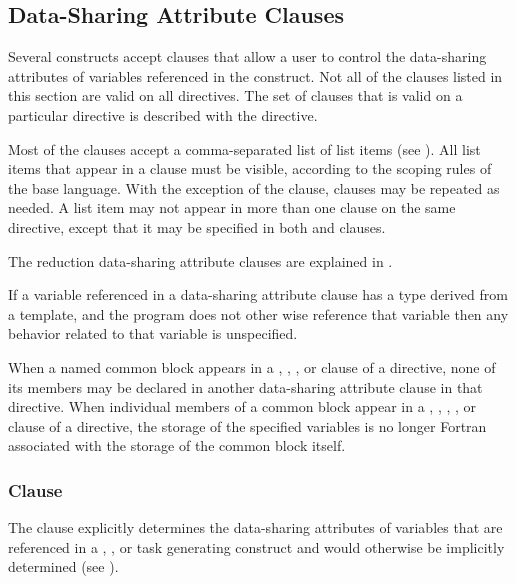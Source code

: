 \subsection{Data-Sharing Attribute Clauses}
\label{subsec:Data-Sharing Attribute Clauses}
Several constructs accept clauses that allow a user to control the data-sharing
attributes of variables referenced in the construct.  Not all of the clauses
listed in this section are valid on all directives. The set of clauses that is
valid on a particular directive is described with the directive.

Most of the clauses accept a comma-separated list of list items (see
). All list items that appear in a clause must be 
visible, according to the scoping rules of the base language. With the exception 
of the  clause, clauses may be repeated as needed. A list item may 
not appear in more than one clause on the same directive, except that it may be 
specified in both  and  clauses.

The reduction data-sharing attribute clauses are explained in 
.

\begin{cppspecific}
If a variable referenced in a data-sharing attribute clause has a type derived from a
template, and the program does not other wise reference that variable then any
behavior related to that variable is unspecified.
\end{cppspecific}

\begin{fortranspecific}
When a named common block appears in a , ,
, or  clause of a directive, none of its members 
may be declared in another data-sharing attribute clause in that directive. When 
individual members of a common block appear in a , ,
, , or  clause of a directive, the 
storage of the specified variables is no longer Fortran associated with the storage 
of the common block itself. 
\end{fortranspecific}



\subsubsection{ Clause}
\label{subsubsec:default clause}
\summary
The  clause explicitly determines the data-sharing attributes of variables that
are referenced in a , , or task generating construct
and would otherwise be implicitly determined (see
).

